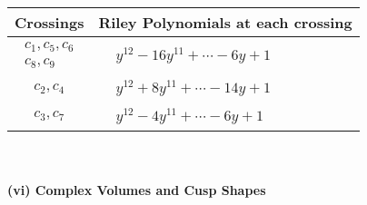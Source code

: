 \documentclass[1p]{elsarticle_modified}
\theoremstyle{definition}
\begin{document}
\begin{tabular}{m{50pt}|m{274pt}}
Crossings & \hspace{64pt}Riley Polynomials at each crossing \\
\hline $$\begin{aligned}c_{1},c_{5},c_{6}\\c_{8},c_{9}\end{aligned}$$&$\begin{aligned}
&y^{12}-16 y^{11}+\cdots-6 y+1
\end{aligned}$\\
\hline $$\begin{aligned}c_{2},c_{4}\end{aligned}$$&$\begin{aligned}
&y^{12}+8 y^{11}+\cdots-14 y+1
\end{aligned}$\\
\hline $$\begin{aligned}c_{3},c_{7}\end{aligned}$$&$\begin{aligned}
&y^{12}-4 y^{11}+\cdots-6 y+1
\end{aligned}$\\
\hline
\end{tabular}\\~\\
\newpage\flushleft \textbf{(vi) Complex Volumes and Cusp Shapes}
\end{document}
